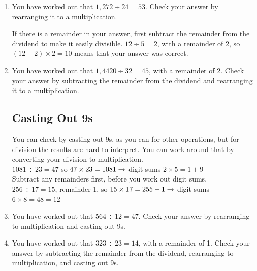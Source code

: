 \documentclass[12pt]{article}
\begin{document}
\begin{enumerate}
\item You have worked out that $1,272 \div 24 = 53$. Check your answer by rearranging it to a multiplication.

If there is a  remainder in your answer, first subtract the remainder from the dividend to make it easily divisible. $12 \div 5 = 2$, with a remainder of 2, so $(12 - 2) \times 2 = 10$ means that your answer was correct.\\

\item You have worked out that $1,4420 \div 32 = 45$, with a remainder of 2. Check your answer by subtracting the remainder from the dividend and rearranging it to a multiplication.

\subsection*{Casting Out 9s}

You can check by casting out 9s, as you can for other operations, but for division the results are hard to interpret. You can work around that by converting your division to multiplication.\\

$1081 \div 23 = 47$ so $47 \times 23 = 1081\\
\rightarrow$ digit sums $2 \times 5 = 1 + 9 $\ \Checkmark\\

Subtract any remainders first, before you work out digit sums.\\

$256 \div 17 =15$, remainder 1,  so $15 \times 17 = 255 - 1\\
\rightarrow$ digit sums $6 \times 8 = 48 = 12$\ \Checkmark\\

\item You have worked out that $564 \div 12 = 47$. Check your answer by rearranging to multiplication and casting out 9s.

\item You have worked out that $323 \div 23 = 14$, with a remainder of 1. Check your answer by subtracting the remainder from the dividend, rearranging to multiplication, and casting out 9s.

\end{enumerate}
\end{document}
